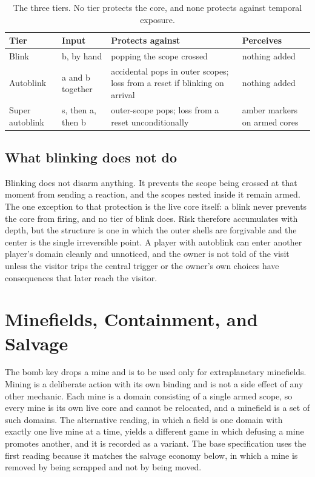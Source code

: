 \documentclass[11pt]{article}
\begin{document}
\begin{table}[h]
\centering
\begin{tabular}{@{}p{2.6cm}p{3.2cm}p{3.8cm}p{2.8cm}@{}}
\toprule
Tier & Input & Protects against & Perceives \\
\midrule
Blink & b, by hand & popping the scope crossed & nothing added \\
Autoblink & a and b together & accidental pops in outer scopes; loss from a reset if blinking on arrival & nothing added \\
Super autoblink & s, then a, then b & outer-scope pops; loss from a reset unconditionally & amber markers on armed cores \\
\bottomrule
\end{tabular}
\caption{The three tiers. No tier protects the core, and none protects against temporal exposure.}
\end{table}

\subsection{What blinking does not do}

Blinking does not disarm anything. It prevents the scope being crossed at that moment from sending a reaction, and the scopes nested inside it remain armed. The one exception to that protection is the live core itself: a blink never prevents the core from firing, and no tier of blink does. Risk therefore accumulates with depth, but the structure is one in which the outer shells are forgivable and the center is the single irreversible point. A player with autoblink can enter another player's domain cleanly and unnoticed, and the owner is not told of the visit unless the visitor trips the central trigger or the owner's own choices have consequences that later reach the visitor.

\section{Minefields, Containment, and Salvage}
\label{sec:mines}

The bomb key drops a mine and is to be used only for extraplanetary minefields. Mining is a deliberate action with its own binding and is not a side effect of any other mechanic. Each mine is a domain consisting of a single armed scope, so every mine is its own live core and cannot be relocated, and a minefield is a set of such domains. The alternative reading, in which a field is one domain with exactly one live mine at a time, yields a different game in which defusing a mine promotes another, and it is recorded as a variant. The base specification uses the first reading because it matches the salvage economy below, in which a mine is removed by being scrapped and not by being moved.
\end{document}
